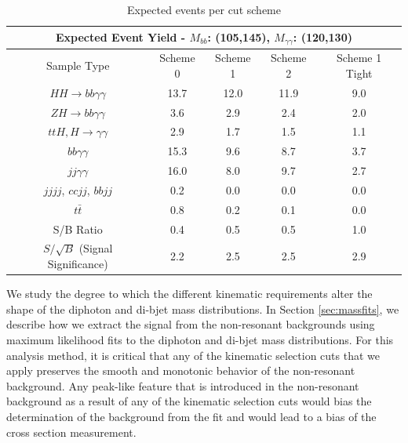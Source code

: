 \documentclass{cmspaper}
\begin{document}
\begin{table}[!ht]
\begin{center}
\begin{tabular}{|c|c|c|c|c|}   
\hline 
\multicolumn{5}{|c|}{\textbf{Expected Event Yield - $M_{bb}$: (105,145), $M_{\gamma\gamma}$: (120,130)}}\\ \hline
Sample Type                        & Scheme 0 & Scheme 1 & Scheme 2 & Scheme 1 Tight                 \\ \hline
$HH\rightarrow bb\gamma\gamma$     & 13.7     & 12.0     & 11.9     & 9.0                            \\ \hline
$ZH\rightarrow bb \gamma\gamma$    & 3.6      & 2.9      & 2.4      & 2.0                            \\ 
$ttH,H\rightarrow\gamma\gamma$     & 2.9      & 1.7      & 1.5      & 1.1                            \\ 
$bb\gamma\gamma$                   & 15.3     & 9.6      & 8.7      & 3.7                            \\ 
$jj\gamma\gamma$                   & 16.0     & 8.0      & 9.7      & 2.7                            \\ 
$jjjj$, $ccjj$, $bbjj$             & 0.2      & 0.0      & 0.0      & 0.0                            \\ 
$t\bar{t}$                         & 0.8      & 0.2      & 0.1      & 0.0                            \\ \hline
S/B Ratio                          & 0.4      & 0.5      & 0.5      & 1.0                            \\ \hline
$S/\sqrt{B}$ (Signal Significance) & 2.2      & 2.5      & 2.5      & 2.9                            \\ \hline
\end{tabular}
\caption{Expected events per cut scheme}
\label{tab:event_schemes}
\end{center}
\end{table}



We study the degree to which the different kinematic requirements alter the shape
of the diphoton and di-bjet mass distributions. In Section \ref{sec:massfits}, we describe how we 
extract the signal from the non-resonant backgrounds using maximum likelihood fits to the
diphoton and di-bjet mass distributions. For this analysis method, it is critical that any of the kinematic selection cuts
that we apply preserves the smooth and monotonic behavior of the non-resonant background. Any
peak-like feature that is introduced in the non-resonant background as a result of any of the
kinematic selection cuts would bias the determination of the background from the fit and would lead
to a bias of the cross section measurement. 
\end{document}
